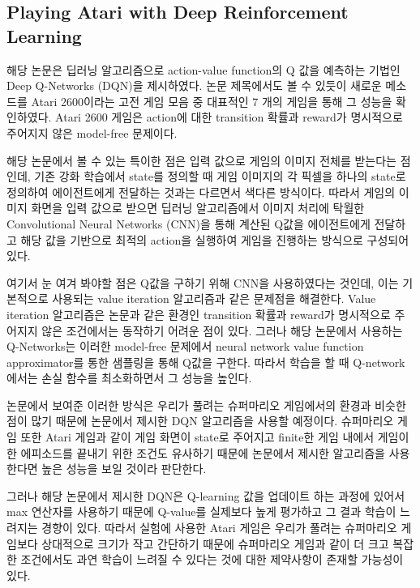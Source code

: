 \subsection{Playing Atari with Deep Reinforcement Learning}
\label{sec:survey:DQN}
해당 논문은 딥러닝 알고리즘으로 action-value function의 Q 값을 예측하는 기법인 Deep Q-Networks (DQN)을 제시하였다. 
논문 제목에서도 볼 수 있듯이 새로운 메소드를 Atari 2600이라는 고전 게임 모음 중 대표적인 7 개의 게임을 통해 그 성능을 확인하였다. 
Atari 2600 게임은 action에 대한 transition 확률과 reward가 명시적으로 주어지지 않은 model-free 문제이다.

해당 논문에서 볼 수 있는 특이한 점은 입력 값으로 게임의 이미지 전체를 받는다는 점인데, 기존 강화 학습에서 state를 정의할 때 게임 이미지의 각 픽셀을 하나의 state로 정의하여 에이전트에게 전달하는 것과는 다르면서 색다른 방식이다. 
따라서 게임의 이미지 화면을 입력 값으로 받으면 딥러닝 알고리즘에서 이미지 처리에 탁월한 Convolutional Neural Networks (CNN)을 통해 계산된 Q값을 에이전트에게 전달하고 해당 값을 기반으로 최적의 action을 실행하여 게임을 진행하는 방식으로 구성되어 있다. 

여기서 눈 여겨 봐야할 점은 Q값을 구하기 위해 CNN을 사용하였다는 것인데, 이는 기본적으로 사용되는 value iteration 알고리즘과 같은 문제점을 해결한다. 
Value iteration 알고리즘은 논문과 같은 환경인 transition 확률과 reward가 명시적으로 주어지지 않은 조건에서는 동작하기 어려운 점이 있다. 
그러나 해당 논문에서 사용하는 Q-Networks는 이러한 model-free 문제에서 neural network value function approximator를 통한 샘플링을 통해 Q값을 구한다. 
따라서 학습을 할 때 Q-network에서는 손실 함수를 최소화하면서 그 성능을 높인다. 

논문에서 보여준 이러한 방식은 우리가 풀려는 슈퍼마리오 게임에서의 환경과 비슷한 점이 많기 때문에 논문에서 제시한 DQN 알고리즘을 사용할 예정이다. 
슈퍼마리오 게임 또한 Atari 게임과 같이 게임 화면이 state로 주어지고 finite한 게임 내에서 게임이 한 에피소드를 끝내기 위한 조건도 유사하기 때문에 논문에서 제시한 알고리즘을 사용한다면 높은 성능을 보일 것이라 판단한다. 

그러나 해당 논문에서 제시한 DQN은 Q-learning 값을 업데이트 하는 과정에 있어서 max 연산자를 사용하기 때문에 Q-value를 실제보다 높게 평가하고 그 결과 학습이 느려지는 경향이 있다. 
따라서 실험에 사용한 Atari 게임은 우리가 풀려는 슈퍼마리오 게임보다 상대적으로 크기가 작고 간단하기 때문에 슈퍼마리오 게임과 같이 더 크고 복잡한 조건에서도 과연 학습이 느려질 수 있다는 것에 대한 제약사항이 존재할 가능성이 있다. 

